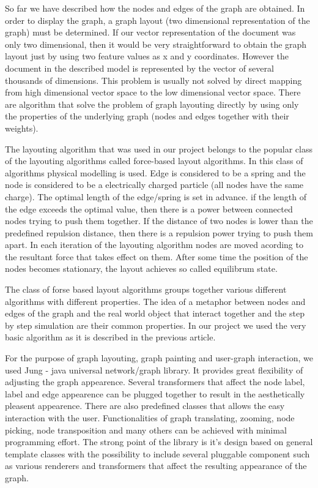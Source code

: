
So far we have described how the nodes and edges of the graph are obtained. In order to display the graph, a graph layout (two dimensional representation of the graph) must be determined. If our vector representation of the document was only two dimensional, then it would be very straightforward to obtain the graph layout just by using two feature values as x and y coordinates. However the document in the described model is represented by the vector of several thousands of dimensions. This problem is usually not solved by direct mapping from high dimensional vector space to the low dimensional vector space. There are algorithm that solve the problem of graph layouting directly by using only the properties of the underlying graph (nodes and edges together with their weights).

The layouting algorithm that was used in our project belongs to the popular class of the layouting algorithms called force-based layout algorithms. In this class of algorithms physical modelling is used. Edge is considered to be a spring and the node is considered to be a electrically charged particle (all nodes have the same charge). The optimal length of the edge/spring is set in advance. if the length of the edge exceeds the optimal value, then there is a power between connected nodes trying to push them together. If the distance of two nodes is lower than the predefined repulsion distance, then there is a repulsion power trying to push them apart. In each iteration of the layouting algorithm nodes are moved acording to the resultant force that takes effect on them. After some time the position of the nodes becomes stationary, the layout achieves so called equilibrum state.

The class of forse based layout algorithms groups together various different algorithms with different properties. The idea of a metaphor between nodes and edges of the graph and the real world object that interact together and the step by step simulation are their common properties. In our project we used the very basic algorithm as it is described in the previous article.

For the purpose of graph layouting, graph painting and user-graph interaction, we used Jung - java universal network/graph library. It provides great flexibility of adjusting the graph appearence. Several transformers that affect the node label, label and edge appearence can be plugged together to result in the aesthetically pleasent appearence. There are also predefined classes that allows the easy interaction with the user. Functionalities of graph translating, zooming, node picking, node transposition and many others can be achieved with minimal programming effort. The strong point of the library is it's design based on general template classes with the possibility to include several pluggable component such as various renderers and transformers that affect the resulting appearance of the graph. 

